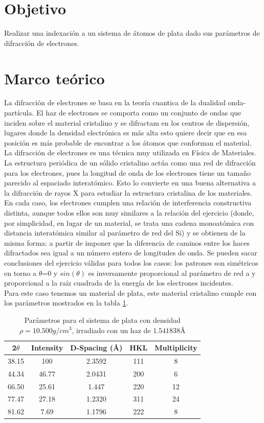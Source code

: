 \documentclass[reprint,amsmath,amssymb,aps,]{revtex4-2}
\begin{document}
\section{Objetivo}
Realizar una indexación a un sistema de átomos de plata dado sus parámetros de difracción de electrones.
\section{Marco teórico}
La difracción de electrones se basa en la teoría cuantica de la dualidad onda-partícula. El haz de electrones se comporta como un conjunto
de ondas que inciden sobre el material cristalino y se difractam en los centros de dispersión, lugares donde la densidad electrónica es más alta
esto quiere decir que en esa posición es más probable de encontrar a los átomos que conforman el material.\\ 
La difracción de electrones es una técnica muy utilizada en Física de Materiales. La estructura periódica
de un sólido cristalino actúa como una red de difracción para los electrones, pues la longitud de onda de
los electrones tiene un tamaño parecido al espaciado interatómico. Esto lo convierte en una buena
alternativa a la difracción de rayos X para
estudiar la estructura cristalina de los
materiales. En cada caso, los electrones cumplen una relación de interferencia constructiva distinta, aunque todos
ellos son muy similares a la relación del ejercicio (donde, por simplicidad, en lugar de un material, se
trata una cadena monoatómica con distancia interatómica similar al parámetro de red del Si) y se
obtienen de la misma forma: a partir de imponer que la diferencia de caminos entre los haces
difractados sea igual a un número entero de longitudes de onda. Se pueden sacar conclusiones del
ejercicio válidas para todos los casos: los patrones son simétricos en torno a $\theta$=0 y $sin(\theta)$ es
inversamente proporcional al parámetro de red a y proporcional a la raíz cuadrada de la energía de los
electrones incidentes.\\
Para este caso tenemos un material de plata, este material cristalino cumple con los parámetros 
mostrados en la tabla \ref{tabla:parametros}.
\begin{table}[H]
    \centering
    \begin{tabular}{ccccc}\hline
        2$\theta$ & Intensity & D-Spacing (\r{A}) & HKL & Multiplicity\\ \hline
        38.15 & 100 & 2.3592 & 111 & 8 \\
        44.34 & 46.77 & 2.0431 & 200 & 6 \\
        66.50 & 25.61 & 1.447 & 220 & 12 \\
        77.47 & 27.18 & 1.2320 & 311 & 24 \\
        81.62 & 7.69 & 1.1796 & 222 & 8 \\ \hline
    \end{tabular}
    \caption{Parámetros para el sistema de plata con densidad $\rho=10.500 g/cm^{3}$, irradiado con un haz de $1.541838$\r{A}}
    \label{tabla:parametros}
\end{table}
\end{document}
